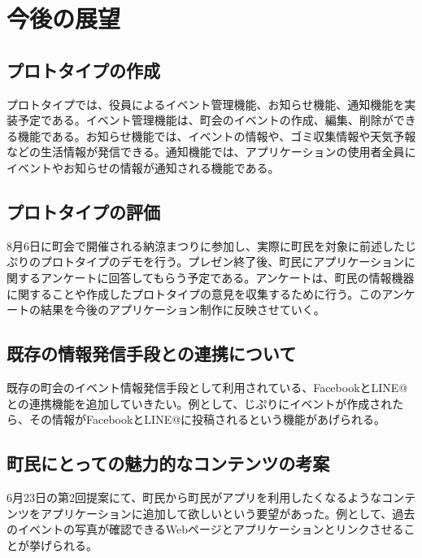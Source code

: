 \chapter{今後の展望}

\section{プロトタイプの作成}
プロトタイプでは、役員によるイベント管理機能、お知らせ機能、通知機能を実装予定である。イベント管理機能は、町会のイベントの作成、編集、削除ができる機能である。お知らせ機能では、イベントの情報や、ゴミ収集情報や天気予報などの生活情報が発信できる。通知機能では、アプリケーションの使用者全員にイベントやお知らせの情報が通知される機能である。
\section{プロトタイプの評価}
8月6日に町会で開催される納涼まつりに参加し、実際に町民を対象に前述したじぷりのプロトタイプのデモを行う。プレゼン終了後、町民にアプリケーションに関するアンケートに回答してもらう予定である。アンケートは、町民の情報機器に関することや作成したプロトタイプの意見を収集するために行う。このアンケートの結果を今後のアプリケーション制作に反映させていく。
\section{既存の情報発信手段との連携について}
既存の町会のイベント情報発信手段として利用されている、FacebookとLINE@との連携機能を追加していきたい。例として、じぷりにイベントが作成されたら、その情報がFacebookとLINE@に投稿されるという機能があげられる。
\section{町民にとっての魅力的なコンテンツの考案}
6月23日の第2回提案にて、町民から町民がアプリを利用したくなるようなコンテンツをアプリケーションに追加して欲しいという要望があった。例として、過去のイベントの写真が確認できるWebページとアプリケーションとリンクさせることが挙げられる。
